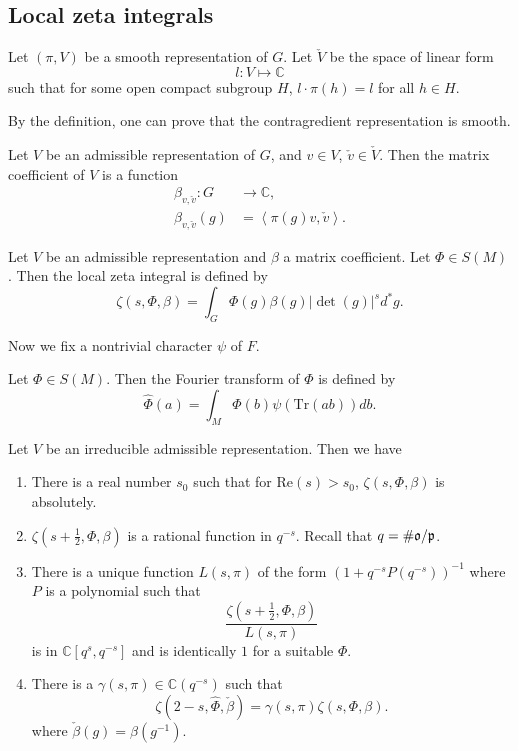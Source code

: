 \subsection{Local zeta integrals}

\begin{definition}
Let $(\pi,V)$ be a smooth representation of $G$. Let $\check V$ be the space of linear form
\[
l \colon V\mapsto \mathbb C
\]
such that for some open compact subgroup $H$, $l\cdot \pi(h)=l$ for all $h\in H$. 
\end{definition}

By the definition, one can prove that the contragredient representation is smooth.

\begin{definition}
Let $V$ be an admissible representation of $G$, and $v\in V$, $\check v\in \check V$. Then the matrix coefficient of $V$ is a function 
\begin{align*}
  \beta_{v,\check v} \colon G&\to \mathbb C,\\
  \beta_{v,\check v} (g) &=\left \langle \pi(g)v,\check v\right \rangle.
\end{align*}
\end{definition}


\begin{definition}
Let $V$ be an admissible representation and $\beta$ a matrix coefficient. Let $\Phi\in S(M)$. Then the local zeta integral is defined by 
\[
\zeta(s,\Phi,\beta)=\int_{G} \Phi(g) \beta(g) \left | \det (g) \right | ^s d^*g.
\]
\end{definition}

Now we fix a nontrivial character $\psi$ of $F$.

\begin{definition}
Let $\Phi\in S(M)$. Then the Fourier transform of $\Phi$ is defined by 
\[
\widehat {\Phi} (a) =\int_M \Phi(b)\psi(\mathrm{Tr}(ab)) db.
\]
\end{definition} 

\begin{theorem}\label{main1}
Let $V$ be an irreducible admissible representation. Then we have
\begin{enumerate}
  \item There is a real number $s_0$ such that for $\mathrm {Re}(s)> s_0$, $\zeta(s, \Phi,\beta)$ is absolutely.
  \item $\zeta(s+\frac 1 2,\Phi,\beta)$ is a rational function in $q^{-s}$. Recall that $q=\#\mathfrak o/\mathfrak p$.
  \item There is a unique function $L(s,\pi)$ of the form $(1 +q^{-s} P(q^{-s}) )^{-1}$ where $P$ is a polynomial such that  
  \[
  \frac {\zeta (s+\frac 1 2, \Phi,\beta) } {L(s,\pi) }
  \]
  is in $\mathbb C[q^s,q^{-s}]$ and is identically $1$ for a suitable $\Phi$.
  \item There is a $\gamma(s,\pi)\in \mathbb C(q^{-s})$ such that 
  \[
  \zeta(2-s,\widehat \Phi,\check \beta)=\gamma(s,\pi) \zeta(s,\Phi,\beta). 
  \]
  where $\check \beta (g) =\beta (g^{-1})$.
\end{enumerate}
\end{theorem}
